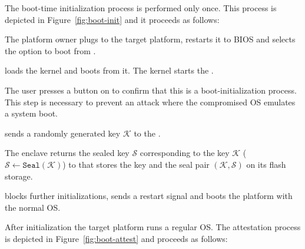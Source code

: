  The boot-time initialization process is performed only once.
This process is depicted in Figure~\ref{fig:boot-init} and it proceeds as follows:



\begin{mylist}
  \item[\one] The platform owner plugs \device to the target platform, restarts it to BIOS and selects the option to boot from \device.
  \item[\two] \device loads the \name kernel and boots from it. The \name kernel starts the \nameclave.
  \item[\three] The user presses a button on \device to confirm that this is a boot-initialization process. This step is necessary to prevent an attack where the compromised OS emulates a system boot.
  \item[\four] \device sends a randomly generated key $\mathcal{K}$ to the \nameclave.
  \item[\five] The enclave returns the sealed key $\mathcal{S}$ corresponding to the key $\mathcal{K}$ ($\mathcal{S}\leftarrow\texttt{Seal}(\mathcal{K})$) to \device that stores the key and the seal pair $(\mathcal{K}, \mathcal{S})$ on its flash storage.
  \item[\six] \device blocks further initializations, sends a restart signal and boots the platform with the normal OS.
\end{mylist}


 After initialization the target platform runs a regular OS. The attestation process is depicted in Figure~\ref{fig:boot-attest} and proceeds as follows:

